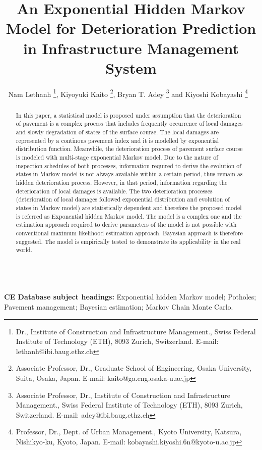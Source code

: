 \documentclass[Journal]{ascelike}
\begin{document}
%
\title{An Exponential Hidden Markov Model for Deterioration Prediction in Infrastructure Management System}
%
\author{Nam Lethanh \thanks{Dr., Institute of Construction and Infrastructure Management., Swiss Federal Institute of Technology (ETH), 8093 Zurich, Switzerland. E-mail: lethanh@ibi.baug.ethz.ch}, Kiyoyuki Kaito \thanks{Associate Professor, Dr., Graduate School of Engineering, Osaka University, Suita, Osaka, Japan. \hspace{10mm}E-mail: kaito@ga.eng.osaka-u.ac.jp}, Bryan T. Adey \thanks{Associate Professor, Dr., Institute of Construction and Infrastructure Management., Swiss Federal Institute of Technology (ETH), 8093 Zurich, Switzerland. E-mail: adey@ibi.baug.ethz.ch} and Kiyoshi Kobayashi%
\thanks{Professor, Dr., Dept. of Urban Management., Kyoto University, Katsura, Nishikyo-ku, Kyoto, Japan. \hspace{10mm}E-mail: kobayashi.kiyoshi.6n@kyoto-u.ac.jp}
\ %
%
}
%
\maketitle
%
\begin{abstract}
In this paper, a statistical model is proposed under assumption that the deterioration of pavement is a complex process that includes frequently occurrence of local damages and slowly degradation of states of the surface course. The local damages are represented by a continous pavement index and it is modelled by exponential distribution function. Meanwhile, the deterioration process of pavement surface course is modeled with multi-stage exponential Markov model. Due to the nature of inspection schedules of both processes, information required to derive the evolution of states in Markov model is not always available within a certain period, thus remain as hidden deterioration process. However, in that period, information regarding the deterioration of local damages is available. The two deterioration processes (deterioration of local damages followed exponential distribution and evolution of states in Markov model) are statistically dependent and therefore the proposed model is referred as Exponential hidden Markov model. The model is a complex one and the estimation approach required to derive parameters of the model is not possible with conventional maximum likelihood estimation approach. Bayesian approach is therefore suggested. The model is empirically tested to demonstrate its applicability in the real world.
\end{abstract}
%
\\
\textbf{CE Database subject headings:} Exponential hidden Markov model; Potholes; Pavement management; Bayesian estimation; Markov Chain Monte Carlo.
\end{document}
